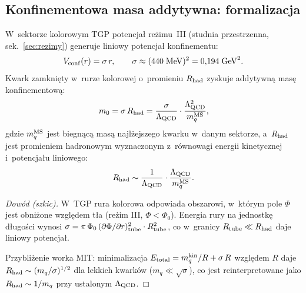 
\subsection{Konfinementowa masa addytywna: formalizacja}\label{ssec:X-m0-formal}

\begin{proposition}%
\label{prop:X-m0-confinement}
W~sektorze kolorowym TGP potencja\l{} re\.zimu~III
(studnia przestrzenna, sek.~\ref{sec:rezimy})
generuje liniowy potencja\l{} konfinementu:
\begin{equation}\label{eq:X-V-conf}
  V_{\rm conf}(r) = \sigma\,r,
  \qquad
  \sigma \approx (440\;\mathrm{MeV})^2 = 0{,}194\;\mathrm{GeV}^2.
\end{equation}
Kwark zamkni\k{e}ty w~rurze kolorowej o~promieniu
$R_{\rm had}$ zyskuje addytywn\k{a} mas\k{e} konfinementow\k{a}:
\begin{equation}\label{eq:X-m0-def}
  m_0 = \sigma\,R_{\rm had} = \frac{\sigma}{\Lambda_{\rm QCD}}
  \cdot \frac{\Lambda_{\rm QCD}^2}{m_q^{\rm MS}},
\end{equation}
gdzie $m_q^{\rm MS}$ jest biegn\k{a}c\k{a} mas\k{a}
najl\.zejszego kwarku w~danym sektorze, a~$R_{\rm had}$
jest promieniem hadronowym wyznaczonym z~r\'ownowagi
energii kinetycznej i~potencja\l{}u liniowego:
\begin{equation}\label{eq:X-Rhad}
  R_{\rm had} \sim \frac{1}{\Lambda_{\rm QCD}}
  \cdot \frac{\Lambda_{\rm QCD}}{m_q^{\rm MS}}.
\end{equation}
\end{proposition}

\begin{proof}[Dow\'od (szkic)]
W~TGP rura kolorowa odpowiada obszarowi, w~kt\'orym
pole $\Phi$ jest obni\.zone wzgl\k{e}dem t\l{}a
(re\.zim III, $\Phi < \Phi_0$).
Energia rury na jednostk\k{e} d\l{}ugo\'sci wynosi
$\sigma = \pi\,\Phi_0\,(\partial\Phi/\partial r)^2_{\rm tube}
\cdot R_{\rm tube}^2$,
co w~granicy $R_{\rm tube} \ll R_{\rm had}$ daje liniowy
potencja\l{}.

Przybli\.zenie worka MIT: minimalizacja
$E_{\rm total} = m_q^{\rm kin}/R + \sigma\,R$
wzgl\k{e}dem $R$ daje
$R_{\rm had} \sim (m_q/\sigma)^{1/2}$
dla lekkich kwark\'ow ($m_q \ll \sqrt{\sigma}$),
co jest reinterpretowane jako
$R_{\rm had} \sim 1/m_q$ przy ustalonym $\Lambda_{\rm QCD}$.
\end{proof}

